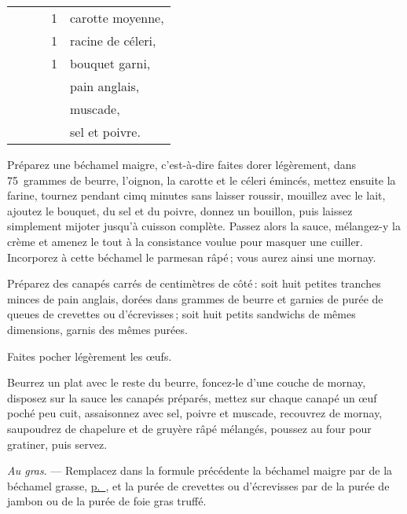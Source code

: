 \begin{longtable}{rrrrp{16em}}
  &       &         &  1 & carotte moyenne,                                                               \\
  &       &         &  1 & racine de céleri,                                                              \\
  &       &         &  1 & bouquet garni,                                                                 \\
  &       &         &    & pain anglais,                                                                  \\
  &       &         &    & muscade,                                                                       \\
  &       &         &    & sel et poivre.                                                                 \\
\end{longtable}
\normalsize

\label{pg0269} \hypertarget{p0269}{}
Préparez une béchamel maigre, c'est-à-dire faites dorer légèrement, dans
75 grammes de beurre, l'oignon, la carotte et le céleri émincés, mettez ensuite
la farine, tournez pendant cimq minutes sans laisser roussir, mouillez avec le
lait, ajoutez le bouquet, du sel et du poivre, donnez un bouillon, puis laissez
simplement mijoter jusqu'à cuisson complète. Passez alors la sauce, mélangez-y
la crème et amenez le tout à la consistance voulue pour masquer une cuiller.
Incorporez à cette béchamel le parmesan râpé ; vous aurez ainsi une mornay.

Préparez des canapés carrés de {\mmm} centimètres de côté : soit huit petites tranches
minces de pain anglais, dorées dans {\mmm} grammes de beurre et garnies de purée
de queues de crevettes ou d'écrevisses ; soit huit petits sandwichs de mêmes
dimensions, garnis des mêmes purées.

Faites pocher légèrement les œufs.

Beurrez un plat avec le reste du beurre, foncez-le d'une couche de mornay,
disposez sur la sauce les canapés préparés, mettez sur chaque canapé un œuf
poché peu cuit, assaisonnez avec sel, poivre et muscade, recouvrez de mornay,
saupoudrez de chapelure et de gruyère râpé mélangés, poussez au four pour
gratiner, puis servez.

\medskip

\textit{Au gras}. — Remplacez dans la formule précédente la béchamel maigre par
de la béchamel grasse, \hyperlink{p0566}{p. \pageref{pg0566}}, et la purée de
crevettes ou d'écrevisses par de la purée de jambon ou de la purée de foie gras
truffé.

